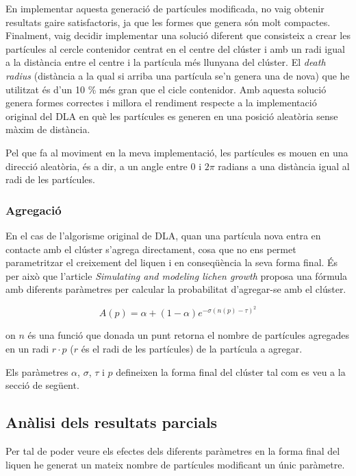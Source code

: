 \documentclass{article}
\begin{document}
En implementar aquesta generació de partícules modificada, no vaig obtenir resultats gaire satisfactoris, ja que les formes que genera són molt compactes.
Finalment, vaig decidir implementar una solució diferent que consisteix a crear les partícules al cercle contenidor centrat en el centre del clúster i amb un radi igual a la distància entre el centre i la partícula més llunyana del clúster. El \textit{death radius} (distància a la qual si arriba una partícula se'n genera una de nova) que he utilitzat és d'un 10 \% més gran que el cicle contenidor. Amb aquesta solució genera formes correctes i millora el rendiment respecte a la implementació original del DLA en què les partícules es generen en una posició aleatòria sense màxim de distància.

Pel que fa al moviment en la meva implementació, les partícules es mouen en una direcció aleatòria, és a dir, a un angle entre $0$ i $2\pi$ radians a una distància igual al radi de les partícules. 

\subsubsection{Agregació}

En el cas de l'algorisme original de DLA, quan una partícula nova entra en contacte amb el clúster s'agrega directament, cosa que no ens permet parametritzar el creixement del liquen i en conseqüència la seva forma final. És per això que l'article \textit{Simulating and modeling lichen growth} \cite{Simulating-and-modeling-lichen-growth} proposa una fórmula amb diferents paràmetres per calcular la probabilitat d'agregar-se amb el clúster.

$$A(p) = \alpha + (1 - \alpha) e ^ {- \sigma (n(p) - \tau) ^ 2} $$

on $n$ és una funció que donada un punt retorna el nombre de partícules agregades en un radi $r \cdot p$ ($r$ és el radi de les partícules) de la partícula a agregar.

Els paràmetres $\alpha$, $\sigma$, $\tau$ i $p$ defineixen la forma final del clúster tal com es veu a la secció de següent.

\subsection{Anàlisi dels resultats parcials}

Per tal de poder veure els efectes dels diferents paràmetres en la forma final del liquen he generat un mateix nombre de partícules modificant un únic paràmetre.
\end{document}
